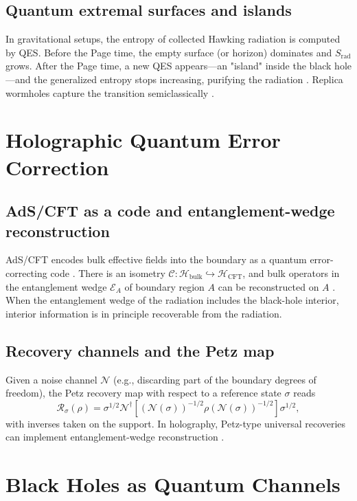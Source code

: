 \documentclass[12pt, numbers, sort&compress]{article}
\begin{document}
\subsection{Quantum extremal surfaces and islands}
In gravitational setups, the entropy of collected Hawking radiation is computed by QES. Before the Page time, the empty surface (or horizon) dominates and $S_{\text{rad}}$ grows. After the Page time, a new QES appears---an "island" inside the black hole---and the generalized entropy stops increasing, purifying the radiation \cite{SciPost:2020islands}. Replica wormholes capture the transition semiclassically \cite{Penington:2023replica}.

\section{Holographic Quantum Error Correction}

\subsection{AdS/CFT as a code and entanglement-wedge reconstruction}
AdS/CFT encodes bulk effective fields into the boundary as a quantum error-correcting code \cite{ADH:2015,HaPPY:2015}. There is an isometry $\mathcal{C}: \mathcal{H}_{\text{bulk}}\hookrightarrow\mathcal{H}_{\text{CFT}}$, and bulk operators in the entanglement wedge $\mathcal{E}_A$ of boundary region $A$ can be reconstructed on $A$ \cite{JLMS:2016}. When the entanglement wedge of the radiation includes the black-hole interior, interior information is in principle recoverable from the radiation.

\subsection{Recovery channels and the Petz map}
Given a noise channel $\mathcal{N}$ (e.g., discarding part of the boundary degrees of freedom), the Petz recovery map with respect to a reference state $\sigma$ reads
\begin{equation}
\mathcal{R}_\sigma(\rho) = \sigma^{1/2}\mathcal{N}^{\dagger}\left[\left(\mathcal{N}(\sigma)\right)^{-1/2} \rho \left(\mathcal{N}(\sigma)\right)^{-1/2}\right]\sigma^{1/2},
\end{equation}
with inverses taken on the support. In holography, Petz-type universal recoveries can implement entanglement-wedge reconstruction \cite{Penington:2019petz}.

\section{Black Holes as Quantum Channels}\label{sec:channels}
\end{document}
